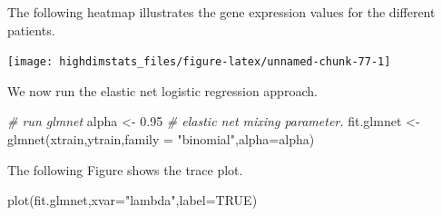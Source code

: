 \documentclass[
]{book}
\newenvironment{Shaded}{\begin{snugshade}}{\end{snugshade}}
\newcommand{\AttributeTok}[1]{\textcolor[rgb]{0.77,0.63,0.00}{#1}}
\newcommand{\CommentTok}[1]{\textcolor[rgb]{0.56,0.35,0.01}{\textit{#1}}}
\newcommand{\ConstantTok}[1]{\textcolor[rgb]{0.00,0.00,0.00}{#1}}
\newcommand{\DecValTok}[1]{\textcolor[rgb]{0.00,0.00,0.81}{#1}}
\newcommand{\FloatTok}[1]{\textcolor[rgb]{0.00,0.00,0.81}{#1}}
\newcommand{\FunctionTok}[1]{\textcolor[rgb]{0.00,0.00,0.00}{#1}}
\newcommand{\NormalTok}[1]{#1}
\newcommand{\OtherTok}[1]{\textcolor[rgb]{0.56,0.35,0.01}{#1}}
\newcommand{\SpecialCharTok}[1]{\textcolor[rgb]{0.00,0.00,0.00}{#1}}
\newcommand{\StringTok}[1]{\textcolor[rgb]{0.31,0.60,0.02}{#1}}
\begin{document}
\begin{Shaded}
\end{Shaded}

The following heatmap illustrates the gene expression values for the different patients.

\begin{center}\texttt{[image: highdimstats\_files/figure-latex/unnamed-chunk-77-1]} \end{center}

We now run the elastic net logistic regression approach.

\begin{Shaded}
\begin{Highlighting}[]
\CommentTok{\# run glmnet}
\NormalTok{alpha  }\OtherTok{\textless{}{-}} \FloatTok{0.95}                \CommentTok{\# elastic net mixing parameter.}
\NormalTok{fit.glmnet }\OtherTok{\textless{}{-}}\FunctionTok{glmnet}\NormalTok{(xtrain,ytrain,}\AttributeTok{family =} \StringTok{"binomial"}\NormalTok{,}\AttributeTok{alpha=}\NormalTok{alpha)}
\end{Highlighting}
\end{Shaded}

The following Figure shows the trace plot.

\begin{Shaded}
\begin{Highlighting}[]
\FunctionTok{plot}\NormalTok{(fit.glmnet,}\AttributeTok{xvar=}\StringTok{"lambda"}\NormalTok{,}\AttributeTok{label=}\ConstantTok{TRUE}\NormalTok{)}
\end{Highlighting}
\end{Shaded}
\end{document}
